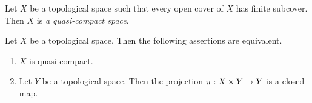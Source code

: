 \begin{definition}
	Let $X$ be a topological space such that every open cover of $X$ has finite subcover. Then $X$ is \textit{a quasi-compact space}.
\end{definition}

\begin{theorem}\label{theorem:Kuratowski_Mrowka_theorem}
	Let $X$ be a topological space. Then the following assertions are equivalent.
	\begin{enumerate}[label=\emph{\textbf{(\roman*)}}, leftmargin=3.0em]
		\item $X$ is quasi-compact.
		\item Let $Y$ be a topological space. Then the projection $\pi:X\times Y \rightarrow Y$ is a closed map.
	\end{enumerate}
\end{theorem}
